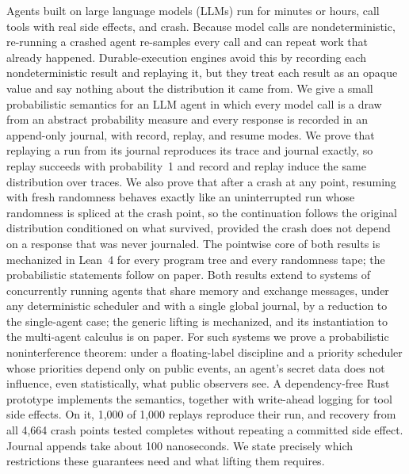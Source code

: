 
Agents built on large language models (LLMs) run for minutes or hours, call tools with real
side effects, and crash.
Because model calls are nondeterministic, re-running a crashed agent re-samples every call
and can repeat work that already happened.
Durable-execution engines avoid this by recording each nondeterministic result and replaying
it, but they treat each result as an opaque value and say nothing about the distribution it
came from.
We give a small probabilistic semantics for an LLM agent in which every model call is a draw
from an abstract probability measure and every response is recorded in an append-only
journal, with record, replay, and resume modes.
We prove that replaying a run from its journal reproduces its trace and journal exactly, so
replay succeeds with probability~1 and record and replay induce the same distribution over
traces.
We also prove that after a crash at any point, resuming with fresh randomness behaves exactly
like an uninterrupted run whose randomness is spliced at the crash point, so the continuation
follows the original distribution conditioned on what survived, provided the crash does not
depend on a response that was never journaled.
The pointwise core of both results is mechanized in Lean~4 for every program tree and every
randomness tape; the probabilistic statements follow on paper.
Both results extend to systems of concurrently running agents that share memory and exchange
messages, under any deterministic scheduler and with a single global journal, by a reduction
to the single-agent case; the generic lifting is mechanized, and its instantiation to the
multi-agent calculus is on paper.
For such systems we prove a probabilistic noninterference theorem: under a floating-label
discipline and a priority scheduler whose priorities depend only on public events, an agent's
secret data does not influence, even statistically, what public observers see.
A dependency-free Rust prototype implements the semantics, together with write-ahead logging
for tool side effects.
On it, 1,000 of 1,000 replays reproduce their run, and recovery from all 4,664 crash points
tested completes without repeating a committed side effect.
Journal appends take about 100 nanoseconds.
We state precisely which restrictions these guarantees need and what lifting them requires.
